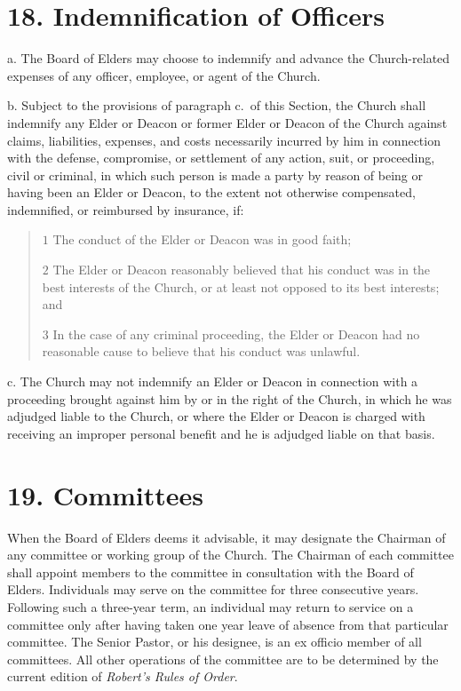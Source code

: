 \documentclass[
]{book}
\begin{document}
\hypertarget{indemnification-of-officers}{%
\section{18. Indemnification of Officers}\label{indemnification-of-officers}}

a. The Board of Elders may choose to indemnify and advance the Church-related expenses of any officer, employee, or agent of the Church.

b. Subject to the provisions of paragraph c.~of this Section, the Church shall indemnify any Elder or Deacon or former Elder or Deacon of the Church against claims, liabilities, expenses, and costs necessarily incurred by him in connection with the defense, compromise, or settlement of any action, suit, or proceeding, civil or criminal, in which such person is made a party by reason of being or having been an Elder or Deacon, to the extent not otherwise compensated, indemnified, or reimbursed by insurance, if:

\begin{quote}
\(1\) The conduct of the Elder or Deacon was in good faith;

\(2\) The Elder or Deacon reasonably believed that his conduct was in the best interests of the Church, or at least not opposed to its best interests; and

\(3\) In the case of any criminal proceeding, the Elder or Deacon had no reasonable cause to believe that his conduct was unlawful.
\end{quote}

c. The Church may not indemnify an Elder or Deacon in connection with a proceeding brought against him by or in the right of the Church, in which he was adjudged liable to the Church, or where the Elder or Deacon is charged with receiving an improper personal benefit and he is adjudged liable on that basis.

\hypertarget{committees}{%
\section{19. Committees}\label{committees}}

When the Board of Elders deems it advisable, it may designate the Chairman of any committee or working group of the Church. The Chairman of each committee shall appoint members to the committee in consultation with the Board of Elders. Individuals may serve on the committee for three consecutive years. Following such a three-year term, an individual may return to service on a committee only after having taken one year leave of absence from that particular committee. The Senior Pastor, or his designee, is an ex officio member of all committees. All other operations of the committee are to be determined by the current edition of \emph{Robert's Rules of Order}.
\end{document}
